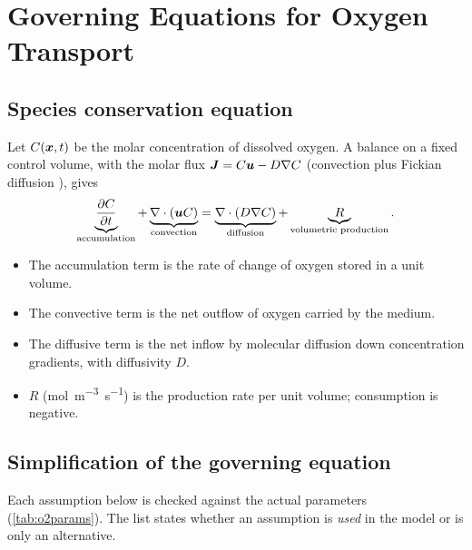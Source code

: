 \chapter{Governing Equations for Oxygen Transport}
\label{ch:o2equations}

\section{Species conservation equation}

Let $C(\bm{x},t)$ be the molar concentration of dissolved oxygen. A balance on a fixed control volume, with the molar flux $\bm{J}=C\bm{u}-D\nabla C$ (convection plus Fickian diffusion \citep{BSL2002,Deen2012}), gives
\begin{equation}
\underbrace{\frac{\partial C}{\partial t}}_{\text{accumulation}}
+\underbrace{\nabla\cdot(\bm{u}C)}_{\text{convection}}
=\underbrace{\nabla\cdot(D\nabla C)}_{\text{diffusion}}
+\underbrace{R}_{\text{volumetric production}} .
\label{eq:ox_general}
\end{equation}
\begin{itemize}
\item The accumulation term is the rate of change of oxygen stored in a unit volume.
\item The convective term is the net outflow of oxygen carried by the medium.
\item The diffusive term is the net inflow by molecular diffusion down concentration gradients, with diffusivity $D$.
\item $R$ (\si{mol.m^{-3}.s^{-1}}) is the production rate per unit volume; consumption is negative.
\end{itemize}

\section{Simplification of the governing equation}

Each assumption below is checked against the actual parameters (\cref{tab:o2params}). The list states whether an assumption is \emph{used} in the model or is only an alternative.


